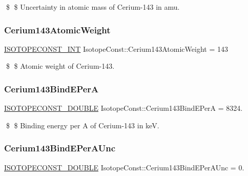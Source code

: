 \$ \$ Uncertainty in atomic mass of Cerium-\/143 in amu. \mbox{\label{group___isotope_const-_cerium-_ce143_gaa4dbb5da35dc2388068b42c3beb6e66e}} 
\subsubsection{\texorpdfstring{Cerium143\+Atomic\+Weight}{Cerium143AtomicWeight}}
{\footnotesize\ttfamily \mbox{\hyperlink{group___isotope_const-_macros_ga5f18360b3e99483a35c32d789e62621c}{I\+S\+O\+T\+O\+P\+E\+C\+O\+N\+S\+T\+\_\+\+I\+NT}} Isotope\+Const\+::\+Cerium143\+Atomic\+Weight = 143}

\$ \$ Atomic weight of Cerium-\/143. \mbox{\label{group___isotope_const-_cerium-_ce143_ga4bbfd259338c82b6fca6ffe4165f8601}} 
\subsubsection{\texorpdfstring{Cerium143\+Bind\+E\+PerA}{Cerium143BindEPerA}}
{\footnotesize\ttfamily \mbox{\hyperlink{group___isotope_const-_macros_ga8f45a7272ce02c0b4c65c44636ed719a}{I\+S\+O\+T\+O\+P\+E\+C\+O\+N\+S\+T\+\_\+\+D\+O\+U\+B\+LE}} Isotope\+Const\+::\+Cerium143\+Bind\+E\+PerA = 8324.}

\$ \$ Binding energy per A of Cerium-\/143 in keV. \mbox{\label{group___isotope_const-_cerium-_ce143_ga065747721a795d8750cb62f8547ade16}} 
\subsubsection{\texorpdfstring{Cerium143\+Bind\+E\+Per\+A\+Unc}{Cerium143BindEPerAUnc}}
{\footnotesize\ttfamily \mbox{\hyperlink{group___isotope_const-_macros_ga8f45a7272ce02c0b4c65c44636ed719a}{I\+S\+O\+T\+O\+P\+E\+C\+O\+N\+S\+T\+\_\+\+D\+O\+U\+B\+LE}} Isotope\+Const\+::\+Cerium143\+Bind\+E\+Per\+A\+Unc = 0.}

